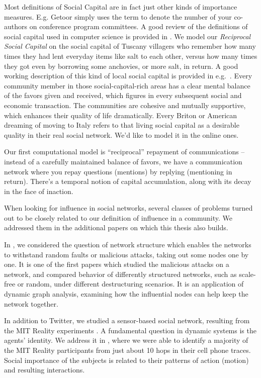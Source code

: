 \documentclass[10pt,oneside]{memoir}
\begin{document}
\begin{Spacing}{2}
Most definitions of Social Capital are in fact just other kinds of importance measures. E.g. Getoor \cite{Licamele:2005:Benefit} simply uses the term to denote the number of your co-authors on conference program committees. A good review of the definitions of social capital used in computer science is provided in \cite{Motidyang:2007:Thesis}. We model our {\itshape Reciprocal Social Capital} on the social capital of Tuscany villagers who remember how many times they had lent everyday items like salt to each other, versus how many times they got even by borrowing some anchovies, or more salt, in return. A good working description of this kind of local social capital is provided in e.g.\ \cite{Gaggio:2007:Gold}. Every community member in those social-capital-rich areas has a clear mental balance of the favors given and received, which figures in every subsequent social and economic transaction.  The communities are cohesive and mutually supportive, which enhances their quality of life dramatically.  Every Briton or American dreaming of moving to Italy refers to that living social capital as a desirable quality in their real social network.  We'd like to model it in the online ones.


Our first computational model is ``reciprocal'' repayment of communications -- instead of a carefully maintained balance of favors, we have a communication network where you repay questions (mentions) by replying (mentioning in return). There's a temporal notion of capital accumulation, along with its decay in the face of inaction.


When looking for influence in social networks, several classes of problems turned out to be closely related to our definition of influence in a community. We addressed them in the additional papers on which this thesis also builds.


In \cite{Khrabrov:2003:Attacks}, we considered the question of network structure which enables the networks to withstand random faults or malicious attacks, taking out some nodes one by one. It is one of the first papers which studied the malicious attacks on a network, and compared behavior of differently structured networks, such as scale-free or random, under different destructuring scenarios. It is an application of dynamic graph analysis, examining how the influential nodes can help keep the network together.


In addition to Twitter, we studied a sensor-based social network, resulting from the MIT Reality experiments \cite{Eagle:2006:Reality}. A fundamental question in dynamic systems is the agents' identity. We address it in \cite{Khrabrov:2009:Language}, where we were able to identify a majority of the MIT Reality participants from just about 10 hops in their cell phone traces. Social importance of the subjects is related to their patterns of action (motion) and resulting interactions.



\end{Spacing}
\end{document}
